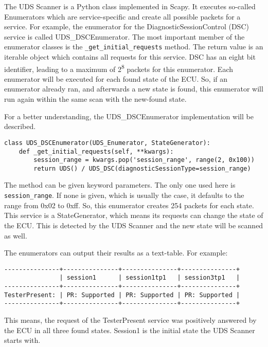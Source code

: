 The UDS Scanner is a Python class implemented in Scapy. It executes so-called Enumerators which are service-specific and create all possible packets for a service.
For example, the enumerator for the DiagnosticSessionControl (DSC) service is called UDS\_DSCEnumerator. The most important member of the enumerator classes is the \texttt{_get_initial_requests} method. The return value is an iterable object which contains all requests for this service. DSC has an eight bit identifier, leading to a maximum of 2\textsuperscript{8} packets for this enumerator. Each enumerator will be executed for each found state of the ECU. So, if an enumerator already ran, and afterwards a new state is found, this enumerator will run again within the same scan with the new-found state.

For a better understanding, the UDS\_DSCEnumerator implementation will be described.

\begin{samepage}
\begin{verbatim}
class UDS_DSCEnumerator(UDS_Enumerator, StateGenerator):
    def _get_initial_requests(self, **kwargs):
        session_range = kwargs.pop('session_range', range(2, 0x100))
        return UDS() / UDS_DSC(diagnosticSessionType=session_range)
\end{verbatim}
\end{samepage}

The method can be given keyword parameters. The only one used here is \texttt{session_range}. If none is given, which is usually the case, it defaults to the range from 0x02 to 0xff. So, this enumerator creates 254 packets for each state. This service is a StateGenerator, which means its requests can change the state of the ECU. This is detected by the UDS Scanner and the new state will be scanned as well.

The enumerators can output their results as a text-table. For example:

\begin{samepage}
\begin{verbatim}
---------------+---------------+---------------+---------------+
               | session1      | session1tp1   | session3tp1   | 
---------------+---------------+---------------+---------------+
TesterPresent: | PR: Supported | PR: Supported | PR: Supported | 
---------------+---------------+---------------+---------------+
\end{verbatim}
\end{samepage}

This means, the request of the TesterPresent service was positively answered by the ECU in all three found states. Session1 is the initial state the UDS Scanner starts with.

